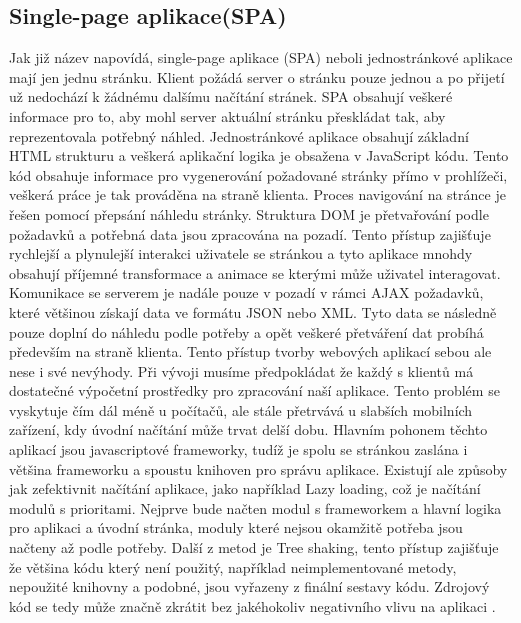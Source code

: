         \subsection{Single-page aplikace(SPA)}
Jak již název napovídá, single-page aplikace (SPA) neboli jednostránkové aplikace mají jen jednu stránku. Klient požádá server o stránku pouze jednou a po přijetí už nedochází k žádnému dalšímu načítání stránek. SPA obsahují veškeré informace pro to, aby mohl server aktuální stránku přeskládat tak, aby reprezentovala potřebný náhled. Jednostránkové aplikace obsahují základní HTML strukturu a veškerá aplikační logika je obsažena v JavaScript kódu. Tento kód obsahuje informace pro vygenerování požadované stránky přímo v prohlížeči, veškerá práce je tak prováděna na straně klienta. Proces navigování na stránce je řešen pomocí přepsání náhledu stránky. Struktura DOM je přetvařování podle požadavků a potřebná data jsou zpracována na pozadí. Tento přístup zajišťuje rychlejší a plynulejší interakci uživatele se stránkou a tyto aplikace mnohdy obsahují příjemné transformace a animace se kterými může uživatel interagovat. Komunikace se serverem je nadále pouze v pozadí v rámci AJAX požadavků, které většinou získají data ve formátu JSON nebo XML. Tyto data se následně pouze doplní do náhledu podle potřeby a opět veškeré přetváření dat probíhá především na straně klienta. Tento přístup tvorby webových aplikací sebou ale nese i své nevýhody. Při vývoji musíme předpokládat že každý s klientů má dostatečné výpočetní prostředky pro zpracování naší aplikace. Tento problém se vyskytuje čím dál méně u počítačů, ale stále přetrvává u slabších mobilních zařízení, kdy úvodní načítání může trvat delší dobu. Hlavním pohonem těchto aplikací jsou javascriptové frameworky, tudíž je spolu se stránkou zaslána i většina frameworku a spoustu knihoven pro správu aplikace. Existují ale způsoby jak zefektivnit načítání aplikace, jako například Lazy loading, což je načítání modulů s prioritami. Nejprve bude načten modul s frameworkem a hlavní logika pro aplikaci a úvodní stránka, moduly které nejsou okamžitě potřeba jsou načteny až podle potřeby. Další z metod je Tree shaking, tento přístup zajišťuje že většina kódu který není použitý, například neimplementované metody, nepoužité knihovny a podobné, jsou vyřazeny z finální sestavy kódu. Zdrojový kód se tedy může značně zkrátit bez jakéhokoliv negativního vlivu na aplikaci \cite{spadevelopment}. 

